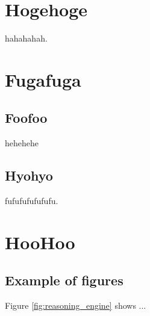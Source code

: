 \documentclass[12pt,dvipdfmx]{report}
\begin{document}
\chapter{Hogehoge} \label{chap:second}

hahahahah.

\chapter{Fugafuga}
\section{Foofoo}
hehehehe

\section{Hyohyo}

fufufufufufufu.

\chapter{HooHoo} \label{chap:third}

\section{Example of figures}

Figure \ref{fig:reasoning_engine} shows ...
\end{document}
